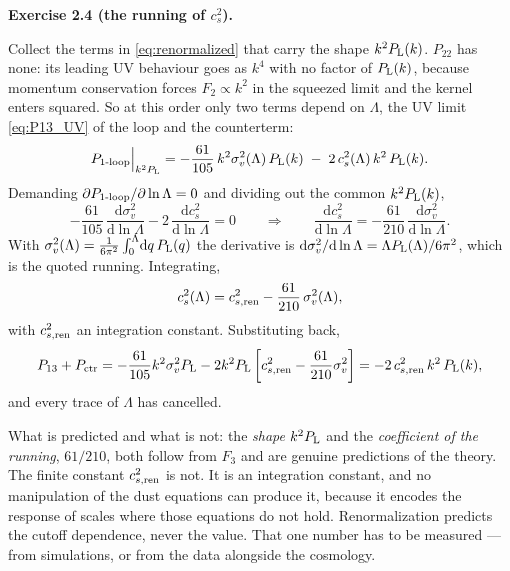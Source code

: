 \documentclass[a4paper,11pt]{article}
\def\Plin{P_{\rm L}}
\newcommand{\dd}{\mathrm{d}}
\newenvironment{solution}[1]
  {\par\medskip\noindent\textbf{#1}\par\nobreak\smallskip}
  {\par\medskip}
\begin{document}
\begin{solution}{Exercise 2.4 (the running of $c_s^2$).}
Collect the terms in \eqref{eq:renormalized} that carry the shape $k^2\Plin(k)$.
$P_{22}$ has none: its leading UV behaviour goes as $k^4$ with no factor of
$\Plin(k)$, because momentum conservation forces $F_2 \propto k^2$ in the
squeezed limit and the kernel enters squared. So at this order only two terms
depend on $\Lambda$, the UV limit \eqref{eq:P13_UV} of the loop and the
counterterm:
\begin{equation*}
P_{\rm 1\text{-}loop}\Big|_{k^2\Plin}
= -\frac{61}{105}\,k^2\sigma_v^2(\Lambda)\,\Plin(k)
\;-\; 2\,c_s^2(\Lambda)\,k^2\,\Plin(k) .
\end{equation*}
Demanding $\partial P_{\rm 1\text{-}loop}/\partial\ln\Lambda = 0$ and dividing
out the common $k^2\Plin(k)$,
\begin{equation*}
-\frac{61}{105}\,\frac{\dd\sigma_v^2}{\dd\ln\Lambda}
- 2\,\frac{\dd c_s^2}{\dd\ln\Lambda} = 0
\qquad\Longrightarrow\qquad
\frac{\dd c_s^2}{\dd\ln\Lambda} = -\frac{61}{210}\,\frac{\dd\sigma_v^2}{\dd\ln\Lambda} .
\end{equation*}
With $\sigma_v^2(\Lambda) = \tfrac{1}{6\pi^2}\int_0^\Lambda\!\dd q\,\Plin(q)$
the derivative is $\dd\sigma_v^2/\dd\ln\Lambda = \Lambda\Plin(\Lambda)/6\pi^2$,
which is the quoted running. Integrating,
\begin{equation*}
c_s^2(\Lambda) = c_{s,\rm ren}^2 - \frac{61}{210}\,\sigma_v^2(\Lambda) ,
\end{equation*}
with $c_{s,\rm ren}^2$ an integration constant. Substituting back,
\begin{equation*}
P_{13} + P_{\rm ctr}
= -\frac{61}{105}k^2\sigma_v^2\Plin
- 2k^2\Plin\left[c_{s,\rm ren}^2 - \frac{61}{210}\sigma_v^2\right]
= -2\,c_{s,\rm ren}^2\,k^2\,\Plin(k) ,
\end{equation*}
and every trace of $\Lambda$ has cancelled.

What is predicted and what is not: the \emph{shape} $k^2\Plin$ and the
\emph{coefficient of the running}, $61/210$, both follow from $F_3$ and are
genuine predictions of the theory. The finite constant $c_{s,\rm ren}^2$ is not.
It is an integration constant, and no manipulation of the dust equations can
produce it, because it encodes the response of scales where those equations do
not hold. Renormalization predicts the cutoff dependence, never the value. That
one number has to be measured --- from simulations, or from the data alongside
the cosmology.
\end{solution}
\end{document}
